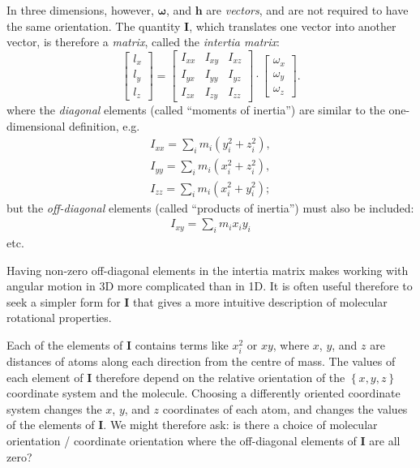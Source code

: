\documentclass[a4paper]{article}
\newcommand{\bvec}[1]{\boldsymbol{\mathbf{#1}}}
\begin{document}
In three dimensions, however, $\bvec{\omega}$, and $\bvec{h}$ are \emph{vectors}, and are not required to have the same orientation. The quantity $\bvec{I}$, which translates one vector into another vector, is therefore a \emph{matrix}, called the \emph{intertia matrix}:
\begin{equation*}
\begin{bmatrix}l_x\\l_y\\l_z\end{bmatrix} = 
\begin{bmatrix} 
I_{xx} & I_{xy} & I_{xz} \\
I_{yx} & I_{yy} & I_{yz} \\
I_{zx} & I_{zy} & I_{zz} 
\end{bmatrix}
\cdot
\begin{bmatrix}\omega_x\\\omega_y\\\omega_z\end{bmatrix}.
\end{equation*}
where the \emph{diagonal} elements (called ``moments of inertia'') are similar to the one-dimensional definition, e.g.
\begin{eqnarray*}
I_{xx} = \sum_i m_i(y_i^2+z_i^2), \\
I_{yy} = \sum_i m_i(x_i^2+z_i^2), \\
I_{zz} = \sum_i m_i(x_i^2+y_i^2);
\end{eqnarray*}
but the \emph{off-diagonal} elements (called ``products of inertia'') must also be included:
\begin{eqnarray*}
I_{xy} = \sum_i m_ix_iy_i
\end{eqnarray*}
etc.

Having non-zero off-diagonal elements in the intertia matrix makes working with angular motion in 3D more complicated than in 1D. It is often useful therefore to seek a simpler form for $\bvec{I}$ that gives a more intuitive description of molecular rotational properties.

Each of the elements of $\bvec{I}$ contains terms like 
$x_i^2$ 
or $xy$, where $x$, $y$, and $z$ are distances of atoms along each direction from the centre of mass. The values of each element of $\bvec{I}$ therefore depend on the relative orientation of the $\left\{x,y,z\right\}$ coordinate system and the molecule. Choosing a differently oriented coordinate system changes the $x$, $y$, and $z$ coordinates of each atom, and changes the values of the elements of $\bvec{I}$. We might therefore ask: is there a choice of molecular orientation / coordinate orientation where the off-diagonal elements of $\bvec{I}$ are all zero?
\end{document}
